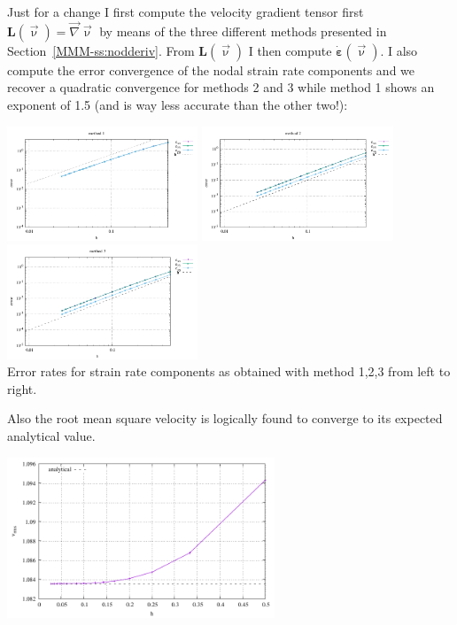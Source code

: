 Just for a change I first compute the velocity gradient tensor 
first ${\bm L}(\vec\upnu)=\vec\nabla\vec\upnu$ by means of 
the three different methods presented in Section~\ref{MMM-ss:nodderiv}.
From ${\bm L}(\vec\upnu)$ I then compute $\dot{\bm \varepsilon}(\vec\upnu)$. 
I also compute the error convergence of the nodal strain rate components 
and we recover a quadratic convergence for methods 2 and 3 while method 1 
shows an exponent of 1.5 (and is way less accurate than the other two!):

\begin{center}
\includegraphics[width=5.7cm]{python_codes/fieldstone_21/results/errors_sr1.pdf}
\includegraphics[width=5.7cm]{python_codes/fieldstone_21/results/errors_sr2.pdf}
\includegraphics[width=5.7cm]{python_codes/fieldstone_21/results/errors_sr3.pdf}\\
{\captionfont Error rates for strain rate components 
as obtained with method 1,2,3 from left to right.}
\end{center}

Also the root mean square velocity is logically found to converge to its 
expected analytical value.

\begin{center}
\includegraphics[width=8cm]{python_codes/fieldstone_21/results/vrms.pdf}
\end{center}

